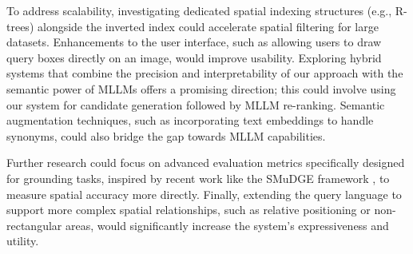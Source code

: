\documentclass[manuscript,screen]{acmart}
\begin{document}
To address scalability, investigating dedicated spatial indexing structures (e.g., R-trees) alongside the inverted index could accelerate spatial filtering for large datasets. Enhancements to the user interface, such as allowing users to draw query boxes directly on an image, would improve usability. Exploring hybrid systems that combine the precision and interpretability of our approach with the semantic power of MLLMs \cite{Huang24, Yin24} offers a promising direction; this could involve using our system for candidate generation followed by MLLM re-ranking. Semantic augmentation techniques, such as incorporating text embeddings to handle synonyms, could also bridge the gap towards MLLM capabilities.

Further research could focus on advanced evaluation metrics specifically designed for grounding tasks, inspired by recent work like the SMuDGE framework \cite{Nguyen25}, to measure spatial accuracy more directly. Finally, extending the query language to support more complex spatial relationships, such as relative positioning or non-rectangular areas, would significantly increase the system's expressiveness and utility.

\begin{acks}

\end{acks}



\end{document}
